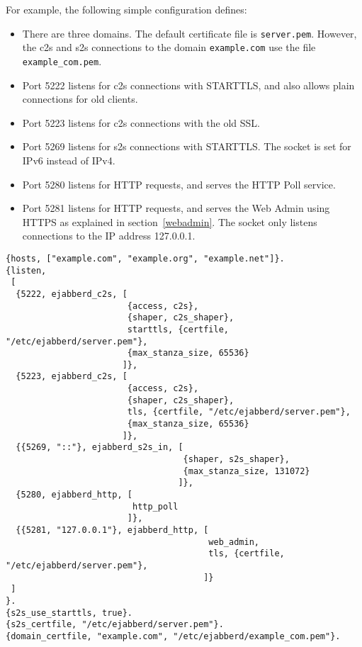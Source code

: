 \documentclass[a4paper,10pt]{book}
\newcommand{\term}[1]{\texttt{#1}}
\begin{document}
For example, the following simple configuration defines:
\begin{itemize}
\item There are three domains. The default certificate file is \term{server.pem}.
However, the c2s and s2s connections to the domain \term{example.com} use the file \term{example\_com.pem}.
\item Port 5222 listens for c2s connections with STARTTLS,
  and also allows plain connections for old clients.
\item Port 5223 listens for c2s connections with the old SSL.
\item Port 5269 listens for s2s connections with STARTTLS. The socket is set for IPv6 instead of IPv4.
\item Port 5280 listens for HTTP requests, and serves the HTTP Poll service.
\item Port 5281 listens for HTTP requests, and serves the Web Admin using HTTPS as explained in
  section~\ref{webadmin}. The socket only listens connections to the IP address 127.0.0.1.
\end{itemize}
\begin{verbatim}
{hosts, ["example.com", "example.org", "example.net"]}.
{listen,
 [
  {5222, ejabberd_c2s, [
                        {access, c2s},
                        {shaper, c2s_shaper},
                        starttls, {certfile, "/etc/ejabberd/server.pem"},
                        {max_stanza_size, 65536}
                       ]},
  {5223, ejabberd_c2s, [
                        {access, c2s},
                        {shaper, c2s_shaper},
                        tls, {certfile, "/etc/ejabberd/server.pem"},
                        {max_stanza_size, 65536}
                       ]},
  {{5269, "::"}, ejabberd_s2s_in, [
                                   {shaper, s2s_shaper},
                                   {max_stanza_size, 131072}
                                  ]},
  {5280, ejabberd_http, [
                         http_poll
                        ]},
  {{5281, "127.0.0.1"}, ejabberd_http, [
                                        web_admin,
                                        tls, {certfile, "/etc/ejabberd/server.pem"},
                                       ]}
 ]
}.
{s2s_use_starttls, true}.
{s2s_certfile, "/etc/ejabberd/server.pem"}.
{domain_certfile, "example.com", "/etc/ejabberd/example_com.pem"}.
\end{verbatim}
\end{document}
